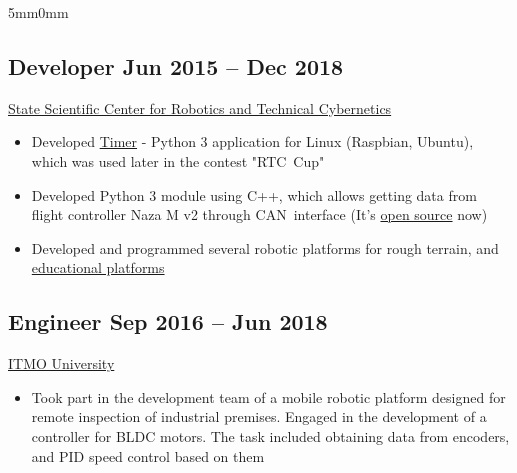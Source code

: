 \documentclass[10pt]{article}
\newcommand{\lmvalue}{5mm}
\newcommand{\rmvalue}{0mm}
\begin{document}
\begin{changemargin}{\lmvalue}{\rmvalue}
        \subsection*{Developer \hfill {\color{gray}Jun 2015 – Dec 2018}}
        \href{https://er.rtc.ru/en/}{State Scientific Center for
        Robotics and Technical Cybernetics}
        \begin{itemize}
            \item Developed
            \href{https://github.com/RTC-SCTB/cuptimer}{Timer} - Python 3 application for
            Linux (Raspbian, Ubuntu), which was used later in the contest "RTC~Cup"
            \item Developed Python 3 module using C++, which allows getting
            data from flight controller Naza M v2 through CAN~interface (It's
            \href{https://github.com/viktorvorobev/NazaCanDecoder}{open source} now)
            \item Developed and programmed several robotic platforms for
            rough terrain, and \href{https://rtc.ru/solution/agro-robot/}{educational platforms}
        \end{itemize}

        \subsection*{Engineer \hfill {\color{gray}Sep 2016 – Jun 2018}}
        \href{https://en.itmo.ru/}{ITMO University}
        \begin{itemize}
            \item Took part in the development team of a mobile robotic
            platform designed for remote inspection of industrial premises.
            Engaged in the development of a controller for BLDC motors.
            The task included obtaining data from encoders, and PID speed control based on them
        \end{itemize}
    \end{changemargin}
\end{document}
